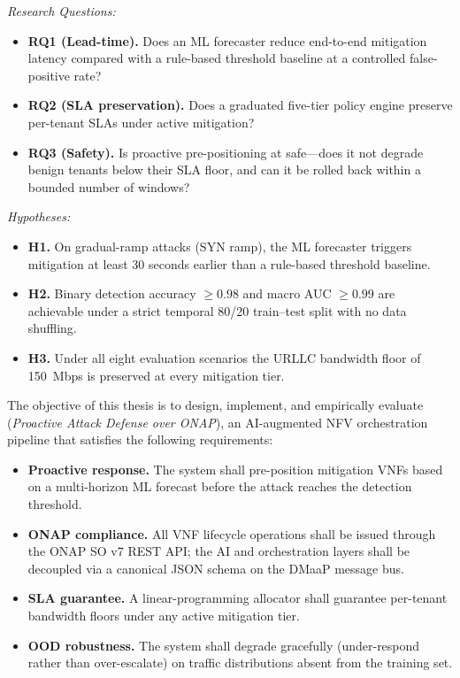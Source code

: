 \medskip
\noindent\textit{Research Questions:}

\begin{itemize}
  \item \textbf{RQ1 (Lead-time).} Does an ML forecaster reduce end-to-end
        mitigation latency compared with a rule-based threshold baseline at
        a controlled false-positive rate?
  \item \textbf{RQ2 (SLA preservation).} Does a graduated five-tier policy
        engine preserve per-tenant SLAs under active mitigation?
  \item \textbf{RQ3 (Safety).} Is proactive pre-positioning at 
        safe---does it not degrade benign tenants below their SLA floor,
        and can it be rolled back within a bounded number of windows?
\end{itemize}

\medskip
\noindent\textit{Hypotheses:}

\begin{itemize}
  \item \textbf{H1.} On gradual-ramp attacks (SYN ramp), the ML forecaster
        triggers mitigation at least 30 seconds earlier than a rule-based
        threshold baseline.
  \item \textbf{H2.} Binary detection accuracy $\geq 0.98$ and macro AUC
        $\geq 0.99$ are achievable under a strict temporal 80/20 train--test
        split with no data shuffling.
  \item \textbf{H3.} Under all eight evaluation scenarios the URLLC bandwidth
        floor of 150~Mbps is preserved at every mitigation tier.
\end{itemize}


The objective of this thesis is to design, implement, and empirically evaluate
\padonap{} (\textit{Proactive Attack Defense over ONAP}), an AI-augmented
NFV orchestration pipeline that satisfies the following requirements:

\begin{itemize}
  \item \textbf{Proactive response.} The system shall pre-position
        mitigation VNFs based on a multi-horizon ML forecast before the
        attack reaches the detection threshold.
  \item \textbf{ONAP compliance.} All VNF lifecycle operations shall be
        issued through the ONAP SO v7 REST API; the AI and orchestration
        layers shall be decoupled via a canonical JSON schema on the DMaaP
        message bus.
  \item \textbf{SLA guarantee.} A linear-programming allocator shall
        guarantee per-tenant bandwidth floors under any active mitigation tier.
  \item \textbf{OOD robustness.} The system shall degrade gracefully
        (under-respond rather than over-escalate) on traffic distributions
        absent from the training set.
\end{itemize}

